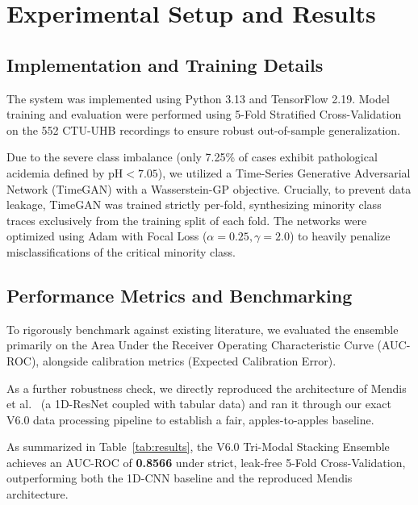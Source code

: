
\section{Experimental Setup and Results}

\subsection{Implementation and Training Details}
The system was implemented using Python 3.13 and TensorFlow 2.19. Model training and evaluation were performed using 5-Fold Stratified Cross-Validation on the 552 CTU-UHB recordings to ensure robust out-of-sample generalization. 

Due to the severe class imbalance (only 7.25\% of cases exhibit pathological acidemia defined by $\text{pH} < 7.05$), we utilized a Time-Series Generative Adversarial Network (TimeGAN) \cite{yoon2019} with a Wasserstein-GP objective. Crucially, to prevent data leakage, TimeGAN was trained strictly per-fold, synthesizing minority class traces exclusively from the training split of each fold. The networks were optimized using Adam with Focal Loss \cite{lin2017} ($\alpha = 0.25, \gamma = 2.0$) to heavily penalize misclassifications of the critical minority class.

\subsection{Performance Metrics and Benchmarking}
To rigorously benchmark against existing literature, we evaluated the ensemble primarily on the Area Under the Receiver Operating Characteristic Curve (AUC-ROC), alongside calibration metrics (Expected Calibration Error). 

As a further robustness check, we directly reproduced the architecture of Mendis et al.\ \cite{mendis2023} (a 1D-ResNet coupled with tabular data) and ran it through our exact V6.0 data processing pipeline to establish a fair, apples-to-apples baseline.

As summarized in Table~\ref{tab:results}, the V6.0 Tri-Modal Stacking Ensemble achieves an AUC-ROC of \textbf{0.8566} under strict, leak-free 5-Fold Cross-Validation, outperforming both the 1D-CNN baseline and the reproduced Mendis architecture.


